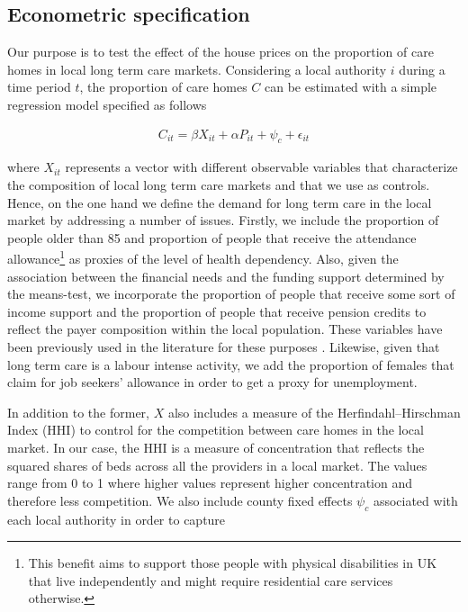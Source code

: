 \documentclass[12pt,letterpaper]{article}
\begin{document}
 \subsection*{Econometric specification}
 
 Our purpose is to test the effect of the house prices on the proportion of care homes in local
  long term care markets. Considering a local authority $i$ during a time period $t$, the proportion of care homes $C$ can be 
estimated with a simple regression model specified as follows
 
 \begin{eqnarray}
\label{eq: equation1}
   C_{it} = \beta X_{it} + \alpha P_{it} + \psi_{c} + \epsilon_{it}
 \end{eqnarray}

where $X_{it}$ represents a vector with different observable variables
 that characterize the composition of local long term care markets and that we use as controls. Hence, on the one hand
 we define the demand for long
  term care in the local market  by addressing a number of issues. Firstly, we include the proportion 
  of people older than 85 and proportion of people that receive the attendance 
  allowance\footnote{This benefit aims to support those people with physical disabilities in UK that live
   independently and might require residential care services otherwise. } as proxies of the level 
   of health dependency. Also, given the association between the financial needs and the funding
    support determined by the means-test, we incorporate the proportion of people that receive some
     sort of income support and the proportion of people that receive pension credits to reflect the payer 
     composition within the local population. These variables have been previously used in the literature for these purposes 
     \citep{darton2010slicing, forder2014}. Likewise, given that long term care is a labour intense activity,
      we add the proportion of females that claim for job seekers’ allowance in order to get a proxy for unemployment.
      
      In addition to the former, $X$ also includes a measure of the Herfindahl–Hirschman Index (HHI) to control for
      the competition between care homes in the local market. In our case, the HHI is a measure of concentration that 
      reflects the squared shares of beds across all the providers in a local market. The values range from
       0 to 1 where higher values represent higher concentration and therefore less competition.  We also include
       county fixed effects $ \psi_c$  associated with each local authority in 
       order to capture 
       
\end{document}
